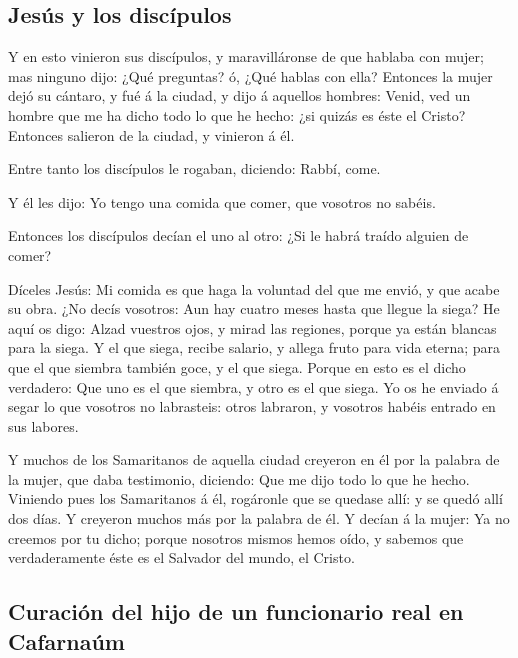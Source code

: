 \hypertarget{jesuxfas-y-los-discuxedpulos}{%
\subsection{Jesús y los discípulos}\label{jesuxfas-y-los-discuxedpulos}}

 Y en esto vinieron sus discípulos, y maravilláronse de que
hablaba con mujer; mas ninguno dijo: ¿Qué preguntas? ó, ¿Qué hablas con
ella?  Entonces la mujer dejó su cántaro, y fué á la
ciudad, y dijo á aquellos hombres:  Venid, ved un hombre
que me ha dicho todo lo que he hecho: ¿si quizás es éste el Cristo?
 Entonces salieron de la ciudad, y vinieron á él.

 Entre tanto los discípulos le rogaban, diciendo: Rabbí,
come.

 Y él les dijo: Yo tengo una comida que comer, que vosotros
no sabéis.

 Entonces los discípulos decían el uno al otro: ¿Si le
habrá traído alguien de comer?

 Díceles Jesús: Mi comida es que haga la voluntad del que
me envió, y que acabe su obra.  ¿No decís vosotros: Aun hay
cuatro meses hasta que llegue la siega? He aquí os digo: Alzad vuestros
ojos, y mirad las regiones, porque ya están blancas para la siega.
 Y el que siega, recibe salario, y allega fruto para vida
eterna; para que el que siembra también goce, y el que siega.
 Porque en esto es el dicho verdadero: Que uno es el que
siembra, y otro es el que siega.  Yo os he enviado á segar
lo que vosotros no labrasteis: otros labraron, y vosotros habéis entrado
en sus labores.

 Y muchos de los Samaritanos de aquella ciudad creyeron en
él por la palabra de la mujer, que daba testimonio, diciendo: Que me
dijo todo lo que he hecho.  Viniendo pues los Samaritanos á
él, rogáronle que se quedase allí: y se quedó allí dos días.
 Y creyeron muchos más por la palabra de él. 
Y decían á la mujer: Ya no creemos por tu dicho; porque nosotros mismos
hemos oído, y sabemos que verdaderamente éste es el Salvador del mundo,
el Cristo.

\hypertarget{curaciuxf3n-del-hijo-de-un-funcionario-real-en-cafarnauxfam}{%
\subsection{Curación del hijo de un funcionario real en
Cafarnaúm}\label{curaciuxf3n-del-hijo-de-un-funcionario-real-en-cafarnauxfam}}

